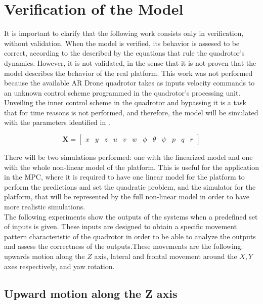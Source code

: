 \section{Verification of the Model}

It is important to clarify that the following work consists only in verification, without validation. When the model is verified, its behavior is assesed to be correct, according to the described by the equations that rule the quadrotor's dynamics. However, it is not validated, in the sense that it is not proven that the model describes the behavior of the real platform. This work was not performed because the available AR Drone quadrotor takes as inputs velocity commands to an unknown control scheme programmed in the quadrotor's processing unit. Unveiling the inner control scheme in the quadrotor and bypassing it is a task that for time reasons is not performed, and therefore, the model will be simulated with the parameters identified in \cite{YueSun2012}. 

\begin{equation} \label{eq:statevector}
\mathbf{X} = \begin{bmatrix} x & y & z & u & v & w & \phi & \theta & \psi & p & q & r \end{bmatrix}
\end{equation} 

There will be two simulations performed: one with the linearized model and one with the whole non-linear model of the platform. This is useful for the application in the MPC, where it is required to have one linear model for the platform to perform the predictions and set the quadratic problem, and the simulator for the platform, that will be represented by the full non-linear model in order to have more realistic simulations. \\

The following experiments show the outputs of the systems when a predefined set of inputs is given. These inputs are designed to obtain a specific movement pattern characteristic of the quadrotor in order to be able to analyze the outputs and assess the correctness of the outputs.These movements are the following: upwards motion along the $Z$ axis, lateral and frontal movement around the $X,Y$ axes respectively, and yaw rotation. 

\subsection{Upward motion along the Z axis}

